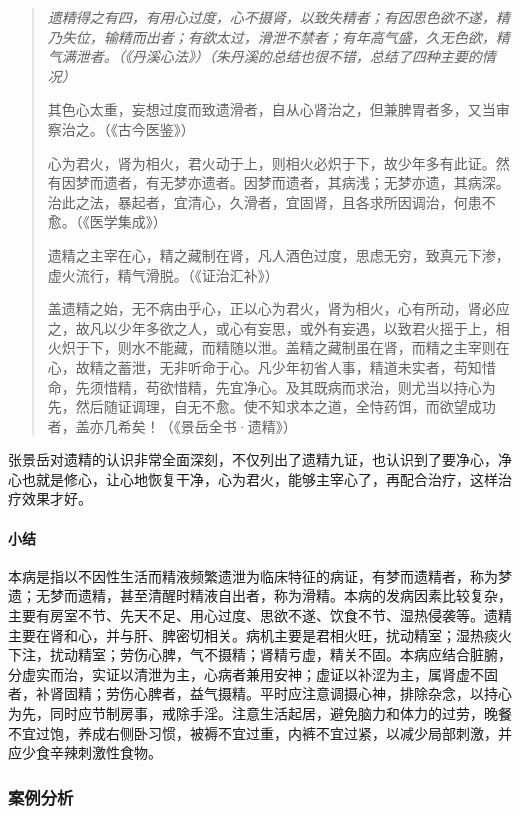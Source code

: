 \begin{quotation}\it
    遗精得之有四，有用心过度，心不摄肾，以致失精者；有因思色欲不遂，精乃失位，输精而出者；有欲太过，滑泄不禁者；有年高气盛，久无色欲，精气满泄者。（《丹溪心法》）（朱丹溪的总结也很不错，总结了四种主要的情况）

    其色心太重，妄想过度而致遗滑者，自从心肾治之，但兼脾胃者多，又当审察治之。（《古今医鉴》）

    心为君火，肾为相火，君火动于上，则相火必炽于下，故少年多有此证。然有因梦而遗者，有无梦亦遗者。因梦而遗者，其病浅；无梦亦遗，其病深。治此之法，暴起者，宜清心，久滑者，宜固肾，且各求所因调治，何患不愈。（《医学集成》）

    遗精之主宰在心，精之藏制在肾，凡人酒色过度，思虑无穷，致真元下渗，虚火流行，精气滑脱。（《证治汇补》）

    盖遗精之始，无不病由乎心，正以心为君火，肾为相火，心有所动，肾必应之，故凡以少年多欲之人，或心有妄思，或外有妄遇，以致君火摇于上，相火炽于下，则水不能藏，而精随以泄。盖精之藏制虽在肾，而精之主宰则在心，故精之蓄泄，无非听命于心。凡少年初省人事，精道未实者，苟知惜命，先须惜精，苟欲惜精，先宜净心。及其既病而求治，则尤当以持心为先，然后随证调理，自无不愈。使不知求本之道，全恃药饵，而欲望成功者，盖亦几希矣！（《景岳全书·遗精》）
\end{quotation}

张景岳对遗精的认识非常全面深刻，不仅列出了遗精九证，也认识到了要净心，净心也就是修心，让心地恢复干净，心为君火，能够主宰心了，再配合治疗，这样治疗效果才好。

\paragraph{小结}

本病是指以不因性生活而精液频繁遗泄为临床特征的病证，有梦而遗精者，称为梦遗；无梦而遗精，甚至清醒时精液自出者，称为滑精。本病的发病因素比较复杂，主要有房室不节、先天不足、用心过度、思欲不遂、饮食不节、湿热侵袭等。遗精主要在肾和心，并与肝、脾密切相关。病机主要是君相火旺，扰动精室；湿热痰火下注，扰动精室；劳伤心脾，气不摄精；肾精亏虚，精关不固。本病应结合脏腑，分虚实而治，实证以清泄为主，心病者兼用安神；虚证以补涩为主，属肾虚不固者，补肾固精；劳伤心脾者，益气摄精。平时应注意调摄心神，排除杂念，以持心为先，同时应节制房事，戒除手淫。注意生活起居，避免脑力和体力的过劳，晚餐不宜过饱，养成右侧卧习惯，被褥不宜过重，内裤不宜过紧，以减少局部刺激，并应少食辛辣刺激性食物。

\subsubsection{案例分析}


